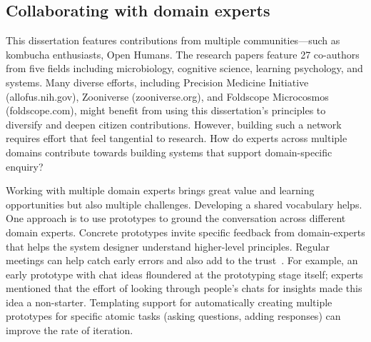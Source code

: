 
\subsection{Collaborating with domain experts}
This dissertation features contributions from multiple communities—such as kombucha enthusiasts, Open Humans. The research papers feature 27 co-authors from five fields including microbiology, cognitive science, learning psychology, and systems. Many diverse efforts, including Precision Medicine Initiative (allofus.nih.gov), Zooniverse (zooniverse.org), and Foldscope Microcosmos (foldscope.com), might benefit from using this dissertation’s principles to diversify and deepen citizen contributions. However, building such a network requires effort that feel tangential to research. How do experts across multiple domains contribute towards building systems that support domain-specific enquiry? 

Working with multiple domain experts brings great value and learning opportunities but also multiple challenges. Developing a shared vocabulary helps. One approach is to use prototypes to ground the conversation across different domain experts. Concrete prototypes invite specific feedback from domain-experts that helps the system designer understand higher-level principles. Regular meetings can help catch early errors and also add to the trust~\cite{rocco1998trust}. For example, an early prototype with chat ideas floundered at the prototyping stage itself; experts mentioned that the effort of looking through people's chats for insights made this idea a non-starter. Templating support for automatically creating multiple prototypes for specific atomic tasks (asking questions, adding responses) can improve the rate of iteration.


